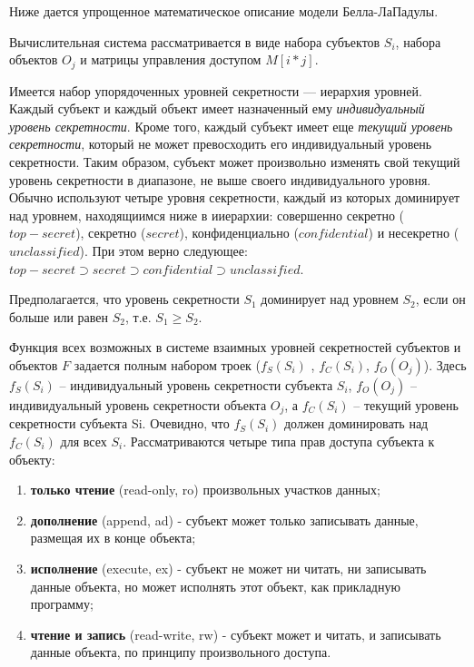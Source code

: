 Ниже дается упрощенное математическое описание модели Белла-ЛаПадулы.

Вычислительная система рассматривается в виде набора субъектов $S_{i}$, набора объектов $O_{j}$ и матрицы управления доступом $M[i*j]$.

Имеется набор упорядоченных уровней секретности --- иерархия уровней. Каждый субъект и каждый объект имеет назначенный ему \textit{индивидуальный уровень секретности}. Кроме того, каждый субъект имеет еще \textit{текущий уровень секретности}, который не может превосходить его индивидуальный уровень секретности. Таким образом, субъект может произвольно изменять свой текущий уровень секретности в диапазоне, не выше своего индивидуального уровня. Обычно используют четыре уровня секретности, каждый из которых доминирует над уровнем, находящиимся ниже в ииерархии: совершенно секретно ($top-secret$),  секретно ($secret$),  конфиденциально ($confidential$) и несекретно ($unclassified$).  При этом верно следующее: $ top-secret \supset secret \supset confidential \supset unclassified $.

Предполагается, что уровень секретности $S_1$ доминирует над уровнем $S_2$, если он больше или равен $S_2$, т.е. $S_1 \geq S_2$.

Функция всех возможных в системе взаимных уровней секретностей субъектов и объектов $F$ задается полным набором троек ($f_S(S_i)$ , $f_C(S_i)$, $f_O(O_j)$). Здесь $f_S(S_i)$ – индивидуальный уровень секретности субъекта $S_i$, $f_O(O_j)$ – индивидуальный уровень секретности объекта $O_j$, а $f_C(S_i)$ – текущий уровень секретности субъекта Si. Очевидно, что $f_S(S_i)$ должен доминировать над $f_C(S_i)$ для всех $S_i$. Рассматриваются четыре типа прав доступа субъекта к объекту:

\begin{enumerate}
	\item\textbf{только чтение} (read-only, ro) произвольных участков данных;
	\item\textbf{дополнение} (append, ad) - субъект может только записывать данные, размещая их в конце объекта;
	\item\textbf{исполнение} (execute, ex) - субъект не может ни читать, ни записывать данные объекта, но может исполнять этот объект, как прикладную программу;
	\item\textbf{чтение и запись} (read-write, rw) - субъект может и читать, и записывать данные объекта, по принципу произвольного доступа.
\end{enumerate}

